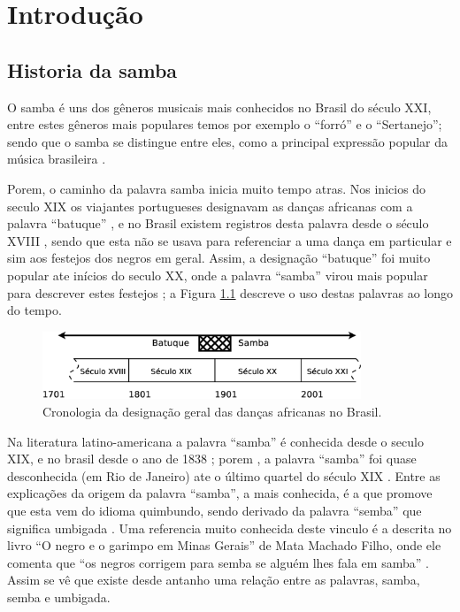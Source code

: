 
\chapter{Introdução}
\section{Historia da samba}
O samba é uns dos gêneros musicais mais conhecidos no Brasil do século XXI,
entre estes gêneros mais populares temos por exemplo o ``forró'' e o ``Sertanejo'';
sendo que o samba se distingue entre eles, 
como a principal expressão popular da música brasileira \cite[pp. 47]{diniz2008almanaque}. 


Porem, o caminho da palavra samba inicia muito tempo atras.
Nos inicios do seculo XIX os viajantes portugueses designavam as danças africanas com a palavra ``batuque'' \cite[pp. 54]{de4danccas},
e no Brasil existem registros desta palavra desde o século XVIII \cite[pp. 85]{sandroni2001feitico} , sendo que
esta não se usava para referenciar a uma dança em particular e sim aos festejos dos negros em geral.
Assim, a designação  ``batuque'' foi muito popular ate inícios do seculo XX, 
onde a palavra ``samba'' virou mais popular para descrever estes festejos \cite[pp. 85]{sandroni2001feitico} \cite[pp. 47]{diniz2008almanaque}; 
a Figura \ref{fig:sambacrono} descreve o uso destas palavras ao longo do tempo.
\begin{figure}[h]
  \centering
    \includegraphics[width=0.85\textwidth]{chapters/cap-intro/samba-crono.eps}
  \caption{Cronologia da designação geral das danças africanas no Brasil.}
  \label{fig:sambacrono}
\end{figure}

Na literatura latino-americana a palavra ``samba'' é conhecida desde o seculo XIX, 
e no brasil desde o ano de 1838 \cite[pp. 47]{diniz2008almanaque}; porem , a palavra ``samba'' foi
quase desconhecida (em Rio de Janeiro) ate o último quartel do século XIX  \cite[pp. 86]{sandroni2001feitico}.
Entre as explicações da origem da palavra ``samba'', 
a mais conhecida, é a que promove que esta vem do idioma quimbundo, 
sendo derivado da palavra ``semba''  que significa umbigada \cite[pp. 47]{diniz2008almanaque} \cite[pp. 50]{da2015historia}.
Uma referencia muito conhecida deste vinculo é a descrita no livro ``O negro e o garimpo em Minas Gerais''
de Mata Machado Filho, onde ele comenta que ``os negros corrigem para semba se 
alguém lhes fala em samba'' \cite[pp. 85]{sandroni2001feitico}. Assim se vê que existe
desde antanho uma relação entre as palavras, 
samba, semba e umbigada.

